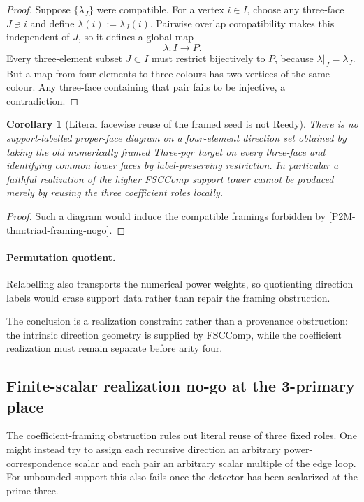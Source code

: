 \documentclass[11pt]{article}
\newtheorem{corollary}[theorem]{Corollary}
\theoremstyle{remark}
\begin{document}
\begin{proof}
Suppose \(\{\lambda_J\}\) were compatible.  For a vertex \(i\in I\), choose
any three-face \(J\ni i\) and define \(\lambda(i):=\lambda_J(i)\).  Pairwise
overlap compatibility makes this independent of \(J\), so it defines a global
map
\[
 \lambda:I\longrightarrow P.
\]
Every three-element subset \(J\subset I\) must restrict bijectively to \(P\),
because \(\lambda|_J=\lambda_J\).  But a map from four elements to three
colours has two vertices of the same colour.  Any three-face containing that
pair fails to be injective, a contradiction.
\end{proof}

\begin{corollary}[Literal facewise reuse of the framed seed is not Reedy]
\label{P2M-cor:literal-face-reuse-nogo}
There is no support-labelled proper-face diagram on a four-element direction
set obtained by taking the old numerically framed Three-\(pqr\) target on every
three-face and identifying common lower faces by label-preserving restriction.
In particular a faithful realization of the higher FSCComp support tower cannot be produced merely by reusing the three coefficient roles locally.
\end{corollary}

\begin{proof}
Such a diagram would induce the compatible framings forbidden by
\cref{P2M-thm:triad-framing-nogo}.
\end{proof}

\paragraph{Permutation quotient.}
Relabelling also transports the numerical power weights, so quotienting
direction labels would erase support data rather than repair the framing
obstruction.


The conclusion is a realization constraint rather than a provenance obstruction: the intrinsic direction geometry is supplied by FSCComp, while the coefficient realization must remain separate before arity four.

\subsection{Finite-scalar realization no-go at the 3-primary place}

The coefficient-framing obstruction rules out literal reuse of three fixed
roles.  One might instead try to assign each recursive direction an arbitrary
power-correspondence scalar and each pair an arbitrary scalar multiple of the
edge loop.  For unbounded support this also fails once the detector has been
scalarized at the prime three.
\end{document}
